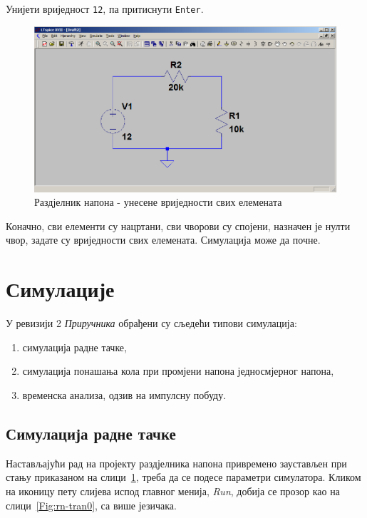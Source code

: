 Унијети вриједност \texttt{12}, па притиснути \texttt{Enter}.

\begin{figure}[h]
\centering
\includegraphics[width=\figwidth\textwidth]{figs/rn-vv2.PNG}
\caption{Раздјелник напона - унесене вриједности свих елемената}
\label{Fig:rn-vv2}
\end{figure}

Коначно, сви елементи су нацртани, сви чворови су спојени, назначен је нулти чвор, задате су вриједности свих елемената. Симулација може да почне.

\chapter{Симулације}
\label{sim}

У ревизији 2 \textit{Приручника} обрађени су сљедећи типови симулација:
\begin{enumerate}
\item симулација радне тачке,
\item симулација понашања кола при промјени напона једносмјерног напона,
\item временска анализа, одзив на импулсну побуду.
\end{enumerate}

\section{Симулација радне тачке}
\label{op}

Настављајући рад на пројекту раздјелника напона привремено заустављен при стању приказаном на слици~\ref{Fig:rn-vv2}, треба да се подесе параметри симулатора. Кликом на иконицу пету слијева испод главног менија, \textit{Run}, добија се прозор као на слици~\ref{Fig:rn-tran0}, са више језичака.

